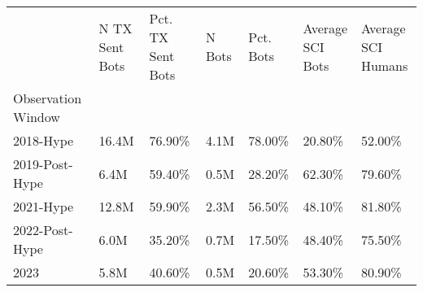 \begin{tabular}{lllllll}
\toprule
{} & \thead{N TX Sent \\Bots} & \thead{Pct. TX Sent \\Bots} & N Bots & Pct. Bots & \thead{Average \\SCI Bots} & \thead{Average \\SCI Humans} \\
Observation Window &                                        &                                           &        &           &                                          &                                            \\
\midrule
2018-Hype          &                                  16.4M &                                    76.90\% &   4.1M &    78.00\% &                                   20.80\% &                                     52.00\% \\
2019-Post-Hype     &                                   6.4M &                                    59.40\% &   0.5M &    28.20\% &                                   62.30\% &                                     79.60\% \\
2021-Hype          &                                  12.8M &                                    59.90\% &   2.3M &    56.50\% &                                   48.10\% &                                     81.80\% \\
2022-Post-Hype     &                                   6.0M &                                    35.20\% &   0.7M &    17.50\% &                                   48.40\% &                                     75.50\% \\
2023               &                                   5.8M &                                    40.60\% &   0.5M &    20.60\% &                                   53.30\% &                                     80.90\% \\
\bottomrule
\end{tabular}
